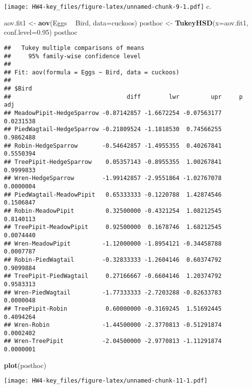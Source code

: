\documentclass[]{article}
\newenvironment{Shaded}{\begin{snugshade}}{\end{snugshade}}
\newcommand{\KeywordTok}[1]{\textcolor[rgb]{0.13,0.29,0.53}{\textbf{#1}}}
\newcommand{\DataTypeTok}[1]{\textcolor[rgb]{0.13,0.29,0.53}{#1}}
\newcommand{\FloatTok}[1]{\textcolor[rgb]{0.00,0.00,0.81}{#1}}
\newcommand{\StringTok}[1]{\textcolor[rgb]{0.31,0.60,0.02}{#1}}
\newcommand{\OperatorTok}[1]{\textcolor[rgb]{0.81,0.36,0.00}{\textbf{#1}}}
\newcommand{\NormalTok}[1]{#1}
\begin{document}
\texttt{[image: HW4-key\_files/figure-latex/unnamed-chunk-9-1.pdf]} c.

\begin{Shaded}
\begin{Highlighting}[]
\NormalTok{aov.fit1 <-}\StringTok{ }\KeywordTok{aov}\NormalTok{(Eggs }\OperatorTok{~}\StringTok{ }\NormalTok{Bird, }\DataTypeTok{data=}\NormalTok{cuckoos)}
\NormalTok{posthoc <-}\StringTok{ }\KeywordTok{TukeyHSD}\NormalTok{(}\DataTypeTok{x=}\NormalTok{aov.fit1, }\DataTypeTok{conf.level=}\FloatTok{0.95}\NormalTok{)}
\NormalTok{posthoc}
\end{Highlighting}
\end{Shaded}

\begin{verbatim}
##   Tukey multiple comparisons of means
##     95% family-wise confidence level
## 
## Fit: aov(formula = Eggs ~ Bird, data = cuckoos)
## 
## $Bird
##                                 diff        lwr         upr     p adj
## MeadowPipit-HedgeSparrow -0.87142857 -1.6672254 -0.07563177 0.0231538
## PiedWagtail-HedgeSparrow -0.21809524 -1.1818530  0.74566255 0.9862488
## Robin-HedgeSparrow       -0.54642857 -1.4955355  0.40267841 0.5550394
## TreePipit-HedgeSparrow    0.05357143 -0.8955355  1.00267841 0.9999833
## Wren-HedgeSparrow        -1.99142857 -2.9551864 -1.02767078 0.0000004
## PiedWagtail-MeadowPipit   0.65333333 -0.1220788  1.42874546 0.1506847
## Robin-MeadowPipit         0.32500000 -0.4321254  1.08212545 0.8140113
## TreePipit-MeadowPipit     0.92500000  0.1678746  1.68212545 0.0074440
## Wren-MeadowPipit         -1.12000000 -1.8954121 -0.34458788 0.0007787
## Robin-PiedWagtail        -0.32833333 -1.2604146  0.60374792 0.9099884
## TreePipit-PiedWagtail     0.27166667 -0.6604146  1.20374792 0.9583313
## Wren-PiedWagtail         -1.77333333 -2.7203288 -0.82633783 0.0000048
## TreePipit-Robin           0.60000000 -0.3169245  1.51692445 0.4094264
## Wren-Robin               -1.44500000 -2.3770813 -0.51291874 0.0002402
## Wren-TreePipit           -2.04500000 -2.9770813 -1.11291874 0.0000001
\end{verbatim}

\begin{Shaded}
\begin{Highlighting}[]
\KeywordTok{plot}\NormalTok{(posthoc)}
\end{Highlighting}
\end{Shaded}

\texttt{[image: HW4-key\_files/figure-latex/unnamed-chunk-11-1.pdf]}
\end{document}
